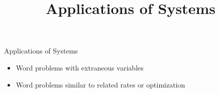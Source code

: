 \documentclass{ximera}
\author{}
\title{Applications of Systems}
\begin{document}
\begin{abstract}
\end{abstract}
\maketitle


\begin{objectives}


\item Applications of Systems
\begin{itemize}
	\item Word problems with extraneous variables
	\item Word problems similar to related rates or optimization
\end{itemize}


\end{objectives}
\end{document}
